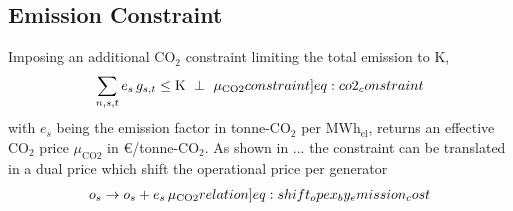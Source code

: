 \documentclass[11pt,twocolumn]{article}
\newcommand{\ubar}[1]{\underaccent{\bar}{#1}}
\newcommand{\hpad}{\hspace{15pt}}
\newcommand{\resultsin}[1]{\hspace{6pt} \bot  \hspace{6pt} #1}
\newcommand{\Forall}[1]{\hspace{10pt} \forall \,\, #1 }
\newcommand{\generation}{g_{s,t}}
\newcommand{\capacitygeneration}{G_{s}}
\newcommand{\capacitygenerationupper}{\bar{G}_{s}}
\newcommand{\capacitygenerationlower}{\ubar{G}_{s}}
\newcommand{\operationalpricegeneration}{o_{s}}
\newcommand{\capitalpricegeneration}{c_{s}}
\newcommand{\muuppergenerationnom}{\bar{\mu}^\text{nom}_{s}}
\newcommand{\mulowergenerationnom}{\ubar{\mu}^\text{nom}_{s}}
\newcommand{\lmp}[1][n]{\lambda_{#1,t}}
\newcommand{\emission}{e_{s}}
\newcommand{\emissionprice}{\mu_{\text{CO2}}}
\newcommand{\megawatthour}{MWh$_\text{el}$}
\begin{document}
\subsection{Emission Constraint}

Imposing an additional CO$_2$ constraint limiting the total emission to K,  
\begin{align}
\sum_{n,s,t} \emission \, \generation \le \text{K} \resultsin{\emissionprice} 
\label[constraint]{eq:co2_constraint}
\end{align}
with $\emission$ being the emission factor in tonne-CO$_2$ per \megawatthour, returns an effective CO$_2$ price $\emissionprice$ in \euro/tonne-CO$_2$. 
% 
As shown in ... the constraint can be translated in a dual price which shift the operational price per generator
\begin{align}
\operationalpricegeneration \rightarrow \operationalpricegeneration + \emission \, \emissionprice \label[relation]{eq:shift_opex_by_emission_cost}
\end{align}




\end{document}

